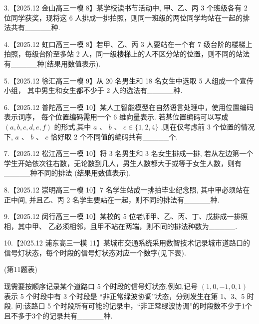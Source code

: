 \documentclass[10pt]{article}
\begin{document}
3.【2025.12 金山高三一模 8】某学校读书节活动中, 甲、乙、丙 3 个班级各有 2 位同学获奖，现将这 6 人排成一排拍照，则同一班级的两位同学均站在一起的排法共有\_\_\_\_\_种.

4.【2025.12 虹口高三一模 8】若甲、乙、丙 3 人要站在一个有 7 级台阶的楼梯上拍照，每级台阶至多站 2 人，同一级楼梯上的人不区分站的位置，则不同的站法有\_\_\_\_\_种(结果用数值表示).

5.【2025.12 徐汇高三一模 9】从 20 名男生和 18 名女生中选取 5 人组成一个宣传小组， 其中男生和女生都不少于 2 人的选法有\_\_\_\_\_种.

6.【2025.12 普陀高三一模 10】某人工智能模型在自然语言处理中，使用位置编码表示词序， 每个位置编码需用一个 6 维向量表示. 若某位置编码可以写成 \(\left( {a,b,c,d,e,f}\right)\) 的形式,其中 \(a\) 、 \(b\text{ 、 }c \in  \{ 1,2,4\}\) ,则在仅考虑前 3 个位置的情况下, \(a\text{ 、 }b\text{ 、 }c\) 恰好取 2 个不同值的编码共有\_\_\_\_\_个.

7.【2025.12 松江高三一模 10】将 3 名男生和 3 名女生排成一排, 若从左边第一个学生开始依次往右数，无论数到几人，男生人数都大于或等于女生人数，则有\_\_\_\_\_种不同的排法 (结果用数值表示).

8.【2025.12 崇明高三一模 10】7 名学生站成一排拍毕业纪念照, 其中甲必须站在正中间, 并且乙、丙 2 名学生要站在一起，则不同的排法有\_\_\_\_\_种.

9.【2025.12 闵行高三一模 10】某校的 5 位老师甲、乙、丙、丁、戊排成一排照相，其中甲、 乙必须相邻，且甲不站在两端，则不同的排法种数为\_\_\_\_\_.

10.【2025.12 浦东高三一模 11】某城市交通系统采用数智技术记录城市道路口的信号灯状态，每个时段的信号灯状态对应一个数字(见下表).

\begin{center}
\end{center}

(第11题表)

现需要按顺序记录某个道路口 5 个时段的信号灯状态,例如,记号 \(\left( {1,0, - 1,0,1}\right)\) 表示 5 个时段中有 3 个时段是 “非正常绿波协调”状态，分别发生在第 1、3、5 时段. 问:该路口 5 个时段所有可能的记录中，“非正常绿波协调”的时段数不少于1个且不多于3个的记录共有\_\_\_\_\_种.
\end{document}
